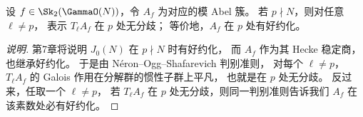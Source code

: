\begin{corollary}
\label{cor:Af-good-reduction-unramified}
设 $f\in \Sk_2(\GammaO(N))$，令 $A_f$ 为对应的模 Abel 簇。
若 $p\nmid N$，则对任意 $\ell\neq p$，
表示 $T_\ell A_f$ 在 $p$ 处无分歧；
等价地，$A_f$ 在 $p$ 处有好约化。
\end{corollary}

\begin{proof}[说明]
第7章将说明 $J_0(N)$ 在 $p\nmid N$ 时有好约化，
而 $A_f$ 作为其 Hecke 稳定商，也继承好约化。
于是由 N\'eron--Ogg--Shafarevich 判别准则，
对每个 $\ell\neq p$，$T_\ell A_f$ 的 Galois 作用在分解群的惯性子群上平凡，
也就是在 $p$ 处无分歧。
反过来，任取一个 $\ell\neq p$，
若 $T_\ell A_f$ 在 $p$ 处无分歧，则同一判别准则告诉我们 $A_f$ 在该素数处必有好约化。
\end{proof}
